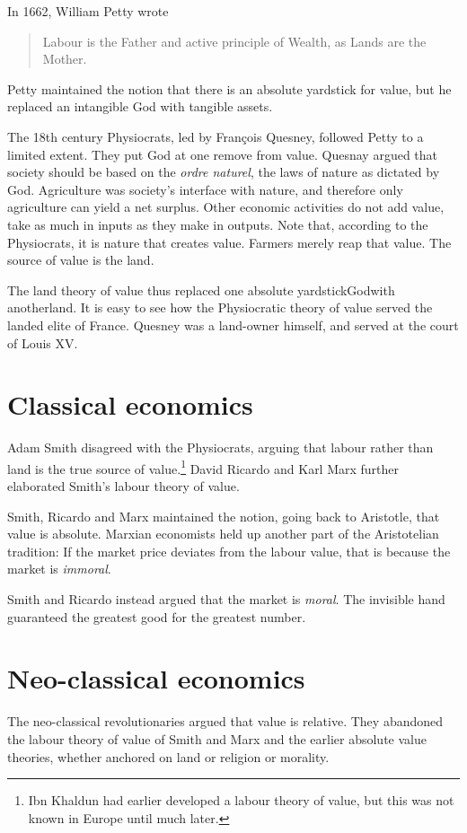 In 1662, William Petty wrote
\begin{quote}
    Labour is the Father and active principle of Wealth, as Lands are the Mother.
\end{quote}
Petty maintained the notion that there is an absolute yardstick for value, but he replaced an intangible God with tangible assets.

The 18th century Physiocrats, led by Fran\c{c}ois Quesney, followed Petty to a limited extent. They put God at one remove from value. Quesnay argued that society should be based on the \emph{ordre naturel}, the laws of nature as dictated by God. Agriculture was society's interface with nature, and therefore only agriculture can yield a net surplus. Other economic activities do not add value, take as much in inputs as they make in outputs. Note that, according to the Physiocrats, it is nature that creates value. Farmers merely reap that value. The source of value is the land.

The land theory of value thus replaced one absolute yardstick\textemdash God\textemdash with another\textemdash land. It is easy to see how the Physiocratic theory of value served the landed elite of France. Quesney was a land-owner himself, and served at the court of Louis XV.

\section{Classical economics}
Adam Smith disagreed with the Physiocrats, arguing that labour rather than land is the true source of value.\footnote{Ibn Khaldun had earlier developed a labour theory of value, but this was not known in Europe until much later.} David Ricardo and Karl Marx further elaborated Smith's labour theory of value.

Smith, Ricardo and Marx maintained the notion, going back to Aristotle, that value is absolute. Marxian economists held up another part of the Aristotelian tradition: If the market price deviates from the labour value, that is because the market is \emph{immoral}.

Smith and Ricardo instead argued that the market is \emph{moral}. The invisible hand guaranteed the greatest good for the greatest number.

\section{Neo-classical economics}
The neo-classical revolutionaries argued that value is relative. They abandoned the labour theory of value of Smith and Marx and the earlier absolute value theories, whether anchored on land or religion or morality.